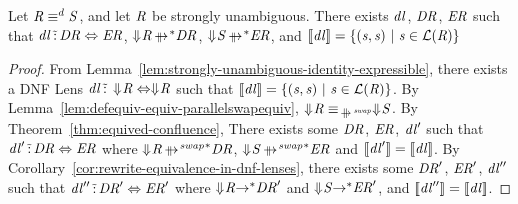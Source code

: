 \documentclass[numbers]{sigplanconf}
\begin{document}
\begin{lemma}
  \label{lem:identity-definitional-equivalence}
  Let $\mathit{R} \equiv^d \mathit{S}$, and let $\mathit{R}$ be strongly
  unambiguous.  There exists $\mathit{dl}$, $\mathit{DR}$, $\mathit{ER}$ such that
  $\mathit{dl} \,\tilde{:}\, \mathit{DR} \Leftrightarrow \mathit{ER}$,
  $\ToDNFRegexOf{\Regex} \StarOf{\ParallelRewrite} \DNFRegex$,
  $\ToDNFRegexOf{\RegexAlt} \StarOf{\ParallelRewrite} \DNFRegexAlt$, and
  $[ \! [\mathit{dl}] \! ] =
  \{(\mathit{s},\mathit{s}) ~|~ \mathit{s}\in\mathcal{L}(\mathit{R})\}$
\end{lemma}
\begin{proof}
  From Lemma~\ref{lem:strongly-unambiguous-identity-expressible}, there exists a
  DNF Lens $\mathit{dl} \,\tilde{:}\, \Downarrow\mkern-4mu \mathit{R} \Leftrightarrow
  \Downarrow\mkern-4mu \mathit{R}$ such that $[ \! [\mathit{dl}] \! ] =
  \{(\mathit{s},\mathit{s}) ~|~ \mathit{s} \in \mathcal{L}(\mathit{R})\}$.
  By Lemma~\ref{lem:defequiv-equiv-parallelswapequiv}, $\ToDNFRegexOf{\Regex}
  \EquivalenceOf{\ParallelRewriteSwap} \ToDNFRegexOf{\RegexAlt}$.  By
  Theorem~\ref{thm:equived-confluence}, There exists some $\mathit{DR}$,
  $\mathit{ER}$, $\mathit{dl}'$ such that $\mathit{dl}' \,\tilde{:}\,
  \mathit{DR} \Leftrightarrow \mathit{ER}$ where
  $\ToDNFRegexOf{\Regex} \StarOf{\ParallelRewriteSwap} \DNFRegex$,
  $\ToDNFRegexOf{\RegexAlt} \StarOf{\ParallelRewriteSwap} \DNFRegexAlt$
  and $[ \! [\mathit{dl}'] \! ] = [ \! [\mathit{dl}] \! ]$.
  By Corollary~\ref{cor:rewrite-equivalence-in-dnf-lenses}, there exists
  some $\mathit{DR}'$, $\mathit{ER}'$, $\mathit{dl}''$ such that $\mathit{dl}''
  \,\tilde{:}\, \mathit{DR}' \Leftrightarrow \mathit{ER}'$ where
  $\Downarrow\mkern-4mu \mathit{R} {\rightarrow}^* \mathit{DR}'$ and
  $\Downarrow\mkern-4mu \mathit{S} {\rightarrow}^* \mathit{ER}'$, and
  $[ \! [\mathit{dl}''] \! ] = [ \! [\mathit{dl}] \! ]$.
\end{proof}
\end{document}
